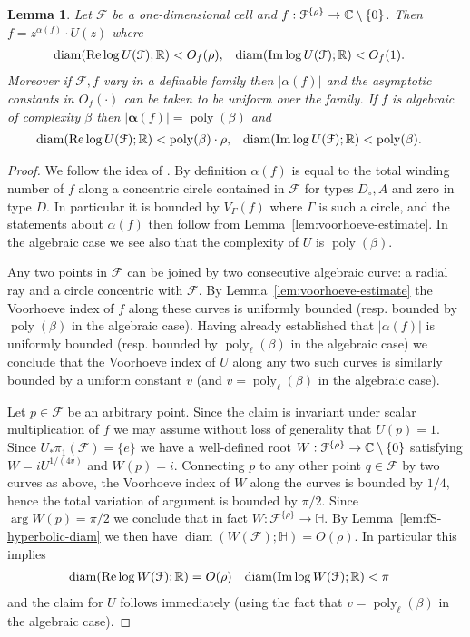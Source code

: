 \documentclass[reqno]{amsart}
\newtheorem{Lem}[Cor]{Lemma}{\bfseries}{\itshape}
\renewcommand\~[1]{\widetilde{#1}}
\def\Re{\operatorname{Re}} \def\Im{\operatorname{Im}}
\def\diam{\operatorname{diam}} \def\ord{\operatorname{ord}}
\def\H{{\mathbb H}}
\def\poly{\operatorname{poly}} \def\J{\operatorname{J}}
\def\cF{{\mathcal F}} \def\cL{{\mathcal L}} \def\cR{{\mathcal R}}
\def\valpha{{\boldsymbol\alpha}}
\def\he#1{{\{#1\}}}
\def\hrho{{\he\rho}}
\begin{document}
\begin{Lem}\label{lem:monom-dim1}
  Let $\cF$ be a one-dimensional cell and
  $f:\cF^\hrho\to\C\setminus\{0\}$. Then $f=z^{\alpha(f)}\cdot U(z)$ where
  \begin{align*}
    \diam(\Re\log U(\cF);\R) &< O_f(\rho), & \diam(\Im\log U(\cF);\R) &< O_f(1).
  \end{align*}
  Moreover if $\cF,f$ vary in a definable family then $|\alpha(f)|$
  and the asymptotic constants in $O_f(\cdot)$ can be taken to be
  uniform over the family. If $f$ is algebraic of complexity $\beta$ then
  $|\valpha(f)|=\poly(\beta)$ and
  \begin{align*}
    \diam(\Re\log U(\cF);\R) &< \poly(\beta)\cdot\rho, & \diam(\Im\log U(\cF);\R) &< \poly(\beta).
  \end{align*}
\end{Lem}
\begin{proof}
  We follow the idea of \cite[Section 4.5]{ky:rolle}. By definition
  $\alpha(f)$ is equal to the total winding number of $f$ along a
  concentric circle contained in $\cF$ for types $D_\circ,A$ and zero
  in type $D$. In particular it is bounded by $V_\Gamma(f)$ where
  $\Gamma$ is such a circle, and the statements about $\alpha(f)$ then
  follow from Lemma~\ref{lem:voorhoeve-estimate}. In the algebraic
  case we see also that the complexity of $U$ is $\poly(\beta)$.

  Any two points in $\cF$ can be joined by two consecutive algebraic
  curve: a radial ray and a circle concentric with $\cF$. By
  Lemma~\ref{lem:voorhoeve-estimate} the Voorhoeve index of $f$ along
  these curves is uniformly bounded (resp.  bounded by $\poly(\beta)$
  in the algebraic case). Having already established that
  $|\alpha(f)|$ is uniformly bounded (resp. bounded by $\poly_\ell(\beta)$
  in the algebraic case) we conclude that the Voorhoeve index of $U$
  along any two such curves is similarly bounded by a uniform constant
  $v$ (and $v=\poly_\ell(\beta)$ in the algebraic case).

  Let $p\in\cF$ be an arbitrary point. Since the claim is invariant
  under scalar multiplication of $f$ we may assume without loss of
  generality that $U(p)=1$. Since $U_*\pi_1(\cF)=\{e\}$ we have a
  well-defined root $W:\cF^\hrho\to\C\setminus\{0\}$ satisfying
  $W=iU^{1/(4v)}$ and $W(p)=i$. Connecting $p$ to any other point
  $q\in\cF$ by two curves as above, the Voorhoeve index of $W$ along
  the curves is bounded by $1/4$, hence the total variation of
  argument is bounded by $\pi/2$. Since $\arg W(p)=\pi/2$ we conclude that
  in fact $W:\cF^\hrho\to\H$. By Lemma~\ref{lem:fS-hyperbolic-diam} we
  then have $\diam(W(\cF);\H)=O(\rho)$. In particular this implies
  \begin{align}
    \diam(\Re\log W(\cF);\R) &= O(\rho) & \diam(\Im\log W(\cF);\R) &< \pi
  \end{align}
  and the claim for $U$ follows immediately (using the fact that
  $v=\poly_\ell(\beta)$ in the algebraic case).
\end{proof}
\end{document}
